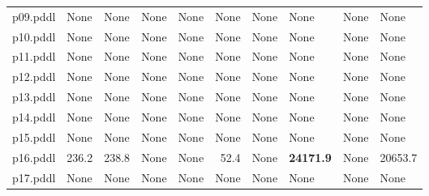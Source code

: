 \documentclass{article}
\begin{document}
\begin{tabular}{@{}lrrrrrrrrr@{}}
p09.pddl & \multicolumn{1}{|l|}{None} & \multicolumn{1}{|l|}{None} & \multicolumn{1}{|l|}{None} & \multicolumn{1}{|l|}{None} & \multicolumn{1}{|l|}{None} & \multicolumn{1}{|l|}{None} & \multicolumn{1}{|l|}{None} & \multicolumn{1}{|l|}{None} & \multicolumn{1}{|l|}{None} \\
p10.pddl & \multicolumn{1}{|l|}{None} & \multicolumn{1}{|l|}{None} & \multicolumn{1}{|l|}{None} & \multicolumn{1}{|l|}{None} & \multicolumn{1}{|l|}{None} & \multicolumn{1}{|l|}{None} & \multicolumn{1}{|l|}{None} & \multicolumn{1}{|l|}{None} & \multicolumn{1}{|l|}{None} \\
p11.pddl & \multicolumn{1}{|l|}{None} & \multicolumn{1}{|l|}{None} & \multicolumn{1}{|l|}{None} & \multicolumn{1}{|l|}{None} & \multicolumn{1}{|l|}{None} & \multicolumn{1}{|l|}{None} & \multicolumn{1}{|l|}{None} & \multicolumn{1}{|l|}{None} & \multicolumn{1}{|l|}{None} \\
p12.pddl & \multicolumn{1}{|l|}{None} & \multicolumn{1}{|l|}{None} & \multicolumn{1}{|l|}{None} & \multicolumn{1}{|l|}{None} & \multicolumn{1}{|l|}{None} & \multicolumn{1}{|l|}{None} & \multicolumn{1}{|l|}{None} & \multicolumn{1}{|l|}{None} & \multicolumn{1}{|l|}{None} \\
p13.pddl & \multicolumn{1}{|l|}{None} & \multicolumn{1}{|l|}{None} & \multicolumn{1}{|l|}{None} & \multicolumn{1}{|l|}{None} & \multicolumn{1}{|l|}{None} & \multicolumn{1}{|l|}{None} & \multicolumn{1}{|l|}{None} & \multicolumn{1}{|l|}{None} & \multicolumn{1}{|l|}{None} \\
p14.pddl & \multicolumn{1}{|l|}{None} & \multicolumn{1}{|l|}{None} & \multicolumn{1}{|l|}{None} & \multicolumn{1}{|l|}{None} & \multicolumn{1}{|l|}{None} & \multicolumn{1}{|l|}{None} & \multicolumn{1}{|l|}{None} & \multicolumn{1}{|l|}{None} & \multicolumn{1}{|l|}{None} \\
p15.pddl & \multicolumn{1}{|l|}{None} & \multicolumn{1}{|l|}{None} & \multicolumn{1}{|l|}{None} & \multicolumn{1}{|l|}{None} & \multicolumn{1}{|l|}{None} & \multicolumn{1}{|l|}{None} & \multicolumn{1}{|l|}{None} & \multicolumn{1}{|l|}{None} & \multicolumn{1}{|l|}{None} \\
p16.pddl & 236.2 & 238.8 & \multicolumn{1}{|l|}{None} & \multicolumn{1}{|l|}{None} & 52.4 & \multicolumn{1}{|l|}{None} & \textbf{24171.9} & \multicolumn{1}{|l|}{None} & 20653.7 \\
p17.pddl & \multicolumn{1}{|l|}{None} & \multicolumn{1}{|l|}{None} & \multicolumn{1}{|l|}{None} & \multicolumn{1}{|l|}{None} & \multicolumn{1}{|l|}{None} & \multicolumn{1}{|l|}{None} & \multicolumn{1}{|l|}{None} & \multicolumn{1}{|l|}{None} & \multicolumn{1}{|l|}{None} \\

\end{tabular}
\end{document}
